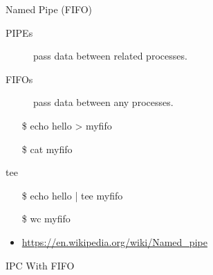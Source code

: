 \begin{frame}{Named Pipe (FIFO)}
  \begin{description}
  \item[PIPEs] pass data between related processes.
  \item[FIFOs] pass data between any processes.
  \end{description}
  \begin{block}{}
    \begin{center}
      \begin{minipage}{.45\linewidth}\ttfamily
        \begin{itemize}
        \item[\$] echo hello > myfifo
        \item[\$] cat myfifo
        \end{itemize}
      \end{minipage}\quad
      \begin{minipage}{.5\linewidth}
      \end{minipage}
    \end{center}
  \end{block}
  \ttfamily
  \begin{block}{tee}
    \begin{minipage}{.5\linewidth}
      \begin{itemize}
      \item[\$] echo hello | tee myfifo
      \item[\$] wc myfifo
      \end{itemize}
    \end{minipage}\quad
    \begin{minipage}{.45\linewidth}
    \end{minipage}
  \end{block}
\end{frame}

\begin{itemize}
\item \url{https://en.wikipedia.org/wiki/Named_pipe}
\end{itemize}

\begin{frame}{IPC With FIFO}
\end{frame}


